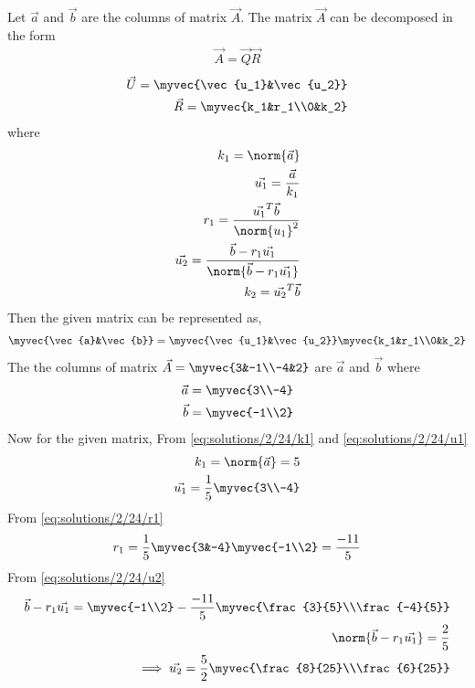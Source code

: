 
Let $\vec{a}$ and $\vec{b}$ are the columns of matrix $\vec{A}$. The matrix $\vec{A}$ can be decomposed in the form
\begin{align}
    \vec{A}=\vec{Q}\vec{R}
\end{align}
\begin{align}
    \vec{U}=\myvec{\vec{u_1}&\vec{u_2}}\\
    \vec{R}=\myvec{k_1&r_1\\0&k_2}
\end{align}
where
\begin{align}
    k_1=\norm{\vec{a}}\label{eq:solutions/2/24/k1}\\
    \vec{u_1}=\frac{\vec{a}}{k_1}\label{eq:solutions/2/24/u1}\\
    r_1=\frac{\vec{u_1}^T\vec{b}}{\norm{u_1}^2}\label{eq:solutions/2/24/r1}\\
    \vec{u_2}=\frac{\vec{b}-r_1\vec{u_1}}{\norm{\vec{b}-r_1\vec{u_1}}}\label{eq:solutions/2/24/u2}\\
    k_2=\vec{u_2}^T\vec{b}\label{eq:solutions/2/24/k2}
\end{align}
Then the given matrix can be represented as,
\begin{align}\label{eq:solutions/2/24/rep}
    \myvec{\vec{a}&\vec{b}}=\myvec{\vec{u_1}&\vec{u_2}}\myvec{k_1&r_1\\0&k_2}
\end{align}
The the columns of matrix $\vec{A}=\myvec{3&-1\\-4&2}$ are $\vec{a}$ and $\vec{b}$ where
\begin{align}
    \vec{a}=\myvec{3\\-4}\label{eq:solutions/2/24/a}\\
    \vec{b}=\myvec{-1\\2}\label{eq:solutions/2/24/b}
\end{align}
Now for the given matrix, From \eqref{eq:solutions/2/24/k1} and \eqref{eq:solutions/2/24/u1}
\begin{align}
k_1=\norm{\vec{a}}=5\\
\vec{u_1}=\frac{1}{5}\myvec{3\\-4}
\end{align}
From \eqref{eq:solutions/2/24/r1}
\begin{align}
r_1=\frac{1}{5}\myvec{3&-4}\myvec{-1\\2}=\frac{-11}{5}
\end{align}
From \eqref{eq:solutions/2/24/u2}
\begin{align}
\vec{b}-r_1\vec{u_1}=\myvec{-1\\2}-\frac{-11}{5}\myvec{\frac{3}{5}\\\frac{-4}{5}}\\
\norm{\vec{b}-r_1\vec{u_1}}=\frac{2}{5}\\
\implies \vec{u_2}=\frac{5}{2}\myvec{\frac{8}{25}\\\frac{6}{25}}
\end{align}
